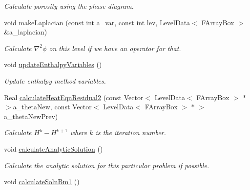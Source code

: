 \begin{DoxyCompactItemize}
\begin{DoxyCompactList}\small\item\em Calculate porosity using the phase diagram. \end{DoxyCompactList}\item 
\hypertarget{classamr_mushy_layer_a4e5595ecd8886f14a9e585aaca80f13f}{void \hyperlink{classamr_mushy_layer_a4e5595ecd8886f14a9e585aaca80f13f}{make\-Laplacian} (const int a\-\_\-var, const int lev, Level\-Data$<$ F\-Array\-Box $>$ \&a\-\_\-laplacian)}\label{classamr_mushy_layer_a4e5595ecd8886f14a9e585aaca80f13f}

\begin{DoxyCompactList}\small\item\em Calculate $ \nabla^2 \phi $ on this level if we have an operator for that. \end{DoxyCompactList}\item 
\hypertarget{classamr_mushy_layer_af2ae32e36e6ea4f55e82d4ae02f44374}{void \hyperlink{classamr_mushy_layer_af2ae32e36e6ea4f55e82d4ae02f44374}{update\-Enthalpy\-Variables} ()}\label{classamr_mushy_layer_af2ae32e36e6ea4f55e82d4ae02f44374}

\begin{DoxyCompactList}\small\item\em Update enthalpy method variables. \end{DoxyCompactList}\item 
\hypertarget{classamr_mushy_layer_acad764d7b02e9d3a46aecd5fa9291658}{Real \hyperlink{classamr_mushy_layer_acad764d7b02e9d3a46aecd5fa9291658}{calculate\-Heat\-Eqn\-Residual2} (const Vector$<$ Level\-Data$<$ F\-Array\-Box $>$ $\ast$ $>$a\-\_\-theta\-New, const Vector$<$ Level\-Data$<$ F\-Array\-Box $>$ $\ast$ $>$ a\-\_\-theta\-New\-Prev)}\label{classamr_mushy_layer_acad764d7b02e9d3a46aecd5fa9291658}

\begin{DoxyCompactList}\small\item\em Calculate $ H^{k} - H^{k+1} $ where $ k $ is the iteration number. \end{DoxyCompactList}\item 
\hypertarget{classamr_mushy_layer_a6ec9dce5f92315519275f8f77a90e968}{void \hyperlink{classamr_mushy_layer_a6ec9dce5f92315519275f8f77a90e968}{calculate\-Analytic\-Solution} ()}\label{classamr_mushy_layer_a6ec9dce5f92315519275f8f77a90e968}

\begin{DoxyCompactList}\small\item\em Calculate the analytic solution for this particular problem if possible. \end{DoxyCompactList}\item 
\hypertarget{classamr_mushy_layer_aec43865ff120106dd5b24076b0cc293e}{void \hyperlink{classamr_mushy_layer_aec43865ff120106dd5b24076b0cc293e}{calculate\-Soln\-Bm1} ()}\label{classamr_mushy_layer_aec43865ff120106dd5b24076b0cc293e}


\end{DoxyCompactItemize}
